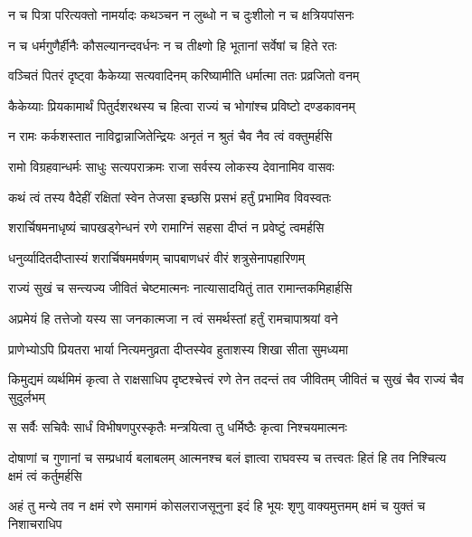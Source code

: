 \twolineshloka
{न च पित्रा परित्यक्तो नामर्यादः कथञ्चन}
{न लुब्धो न च दुःशीलो न च क्षत्रियपांसनः} %

\twolineshloka
{न च धर्मगुणैर्हीनैः कौसल्यानन्दवर्धनः}
{न च तीक्ष्णो हि भूतानां सर्वेषां च हिते रतः} %

\twolineshloka
{वञ्चितं पितरं दृष्ट्वा कैकेय्या सत्यवादिनम्}
{करिष्यामीति धर्मात्मा ततः प्रव्रजितो वनम्} %

\twolineshloka
{कैकेय्याः प्रियकामार्थं पितुर्दशरथस्य च}
{हित्वा राज्यं च भोगांश्च प्रविष्टो दण्डकावनम्} %

\twolineshloka
{न रामः कर्कशस्तात नाविद्वान्नाजितेन्द्रियः}
{अनृतं न श्रुतं चैव नैव त्वं वक्तुमर्हसि} %

\twolineshloka
{रामो विग्रहवान्धर्मः साधुः सत्यपराक्रमः}
{राजा सर्वस्य लोकस्य देवानामिव वासवः} %

\twolineshloka
{कथं त्वं तस्य वैदेहीं रक्षितां स्वेन तेजसा}
{इच्छसि प्रसभं हर्तुं प्रभामिव विवस्वतः} %

\twolineshloka
{शरार्चिषमनाधृष्यं चापखड्गेन्धनं रणे}
{रामाग्निं सहसा दीप्तं न प्रवेष्टुं त्वमर्हसि} %

\twolineshloka
{धनुर्व्यादितदीप्तास्यं शरार्चिषममर्षणम्}
{चापबाणधरं वीरं शत्रुसेनापहारिणम्} %

\twolineshloka
{राज्यं सुखं च सन्त्यज्य जीवितं चेष्टमात्मनः}
{नात्यासादयितुं तात रामान्तकमिहार्हसि} %

\twolineshloka
{अप्रमेयं हि तत्तेजो यस्य सा जनकात्मजा}
{न त्वं समर्थस्तां हर्तुं रामचापाश्रयां वने} %

\twolineshloka
{प्राणेभ्योऽपि प्रियतरा भार्या नित्यमनुव्रता}
{दीप्तस्येव हुताशस्य शिखा सीता सुमध्यमा} %

\threelineshloka
{किमुद्यमं व्यर्थमिमं कृत्वा ते राक्षसाधिप}
{दृष्टश्चेत्त्वं रणे तेन तदन्तं तव जीवितम्}
{जीवितं च सुखं चैव राज्यं चैव सुदुर्लभम्} %

\twolineshloka
{स सर्वैः सचिवैः सार्धं विभीषणपुरस्कृतैः}
{मन्त्रयित्वा तु धर्मिष्ठैः कृत्वा निश्चयमात्मनः} %

\threelineshloka
{दोषाणां च गुणानां च सम्प्रधार्य बलाबलम्}
{आत्मनश्च बलं ज्ञात्वा राघवस्य च तत्त्वतः}
{हितं हि तव निश्चित्य क्षमं त्वं कर्तुमर्हसि} %

\fourlineindentedshloka
{अहं तु मन्ये तव न क्षमं रणे}
{समागमं कोसलराजसूनुना}
{इदं हि भूयः शृणु वाक्यमुत्तमम्}
{क्षमं च युक्तं च निशाचराधिप} %


